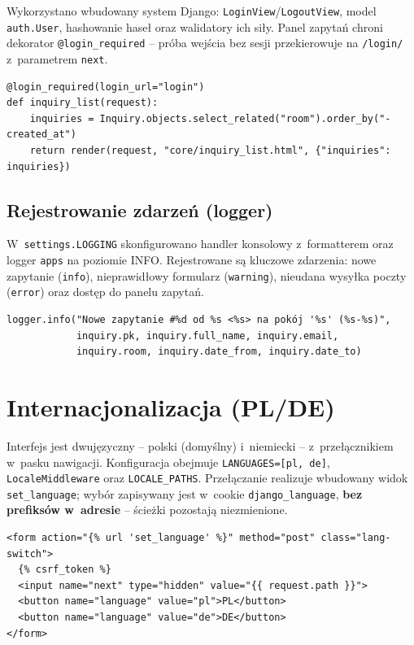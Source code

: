 \documentclass[12pt,a4paper]{article}
\begin{document}
Wykorzystano wbudowany system Django: \texttt{LoginView}/\texttt{LogoutView}, model
\texttt{auth.User}, hashowanie haseł oraz walidatory ich siły. Panel zapytań chroni
dekorator \texttt{@login\_required} -- próba wejścia bez sesji przekierowuje na
\texttt{/login/} z~parametrem \texttt{next}.

\begin{lstlisting}[style=pythonstyle, caption={Ochrona panelu obsługi (views/inquiries.py)}]
@login_required(login_url="login")
def inquiry_list(request):
    inquiries = Inquiry.objects.select_related("room").order_by("-created_at")
    return render(request, "core/inquiry_list.html", {"inquiries": inquiries})
\end{lstlisting}

\subsection{Rejestrowanie zdarzeń (logger)}

W~\texttt{settings.LOGGING} skonfigurowano handler konsolowy z~formatterem oraz
logger \texttt{apps} na poziomie INFO. Rejestrowane są kluczowe zdarzenia: nowe
zapytanie (\texttt{info}), nieprawidłowy formularz (\texttt{warning}), nieudana
wysyłka poczty (\texttt{error}) oraz dostęp do panelu zapytań.

\begin{lstlisting}[style=pythonstyle, caption={Logowanie zdarzenia biznesowego (views/inquiries.py)}]
logger.info("Nowe zapytanie #%d od %s <%s> na pokój '%s' (%s-%s)",
            inquiry.pk, inquiry.full_name, inquiry.email,
            inquiry.room, inquiry.date_from, inquiry.date_to)
\end{lstlisting}

\section{Internacjonalizacja (PL/DE)}
\label{sec:i18n}

Interfejs jest dwujęzyczny -- polski (domyślny) i~niemiecki -- z~przełącznikiem
w~pasku nawigacji. Konfiguracja obejmuje \texttt{LANGUAGES=[pl, de]},
\texttt{LocaleMiddleware} oraz \texttt{LOCALE\_PATHS}. Przełączanie realizuje
wbudowany widok \texttt{set\_language}; wybór zapisywany jest w~cookie
\texttt{django\_language}, \textbf{bez prefiksów w~adresie} -- ścieżki pozostają
niezmienione.

\begin{lstlisting}[style=djangostyle, caption={Przełącznik języka w nawigacji (base.html)}]
<form action="{% url 'set_language' %}" method="post" class="lang-switch">
  {% csrf_token %}
  <input name="next" type="hidden" value="{{ request.path }}">
  <button name="language" value="pl">PL</button>
  <button name="language" value="de">DE</button>
</form>
\end{lstlisting}
\end{document}
